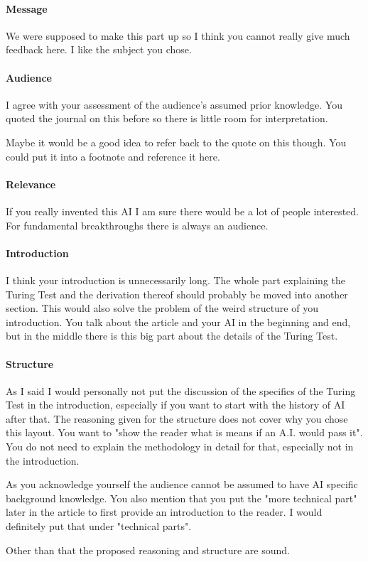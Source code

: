 \documentclass[12pt, a4paper]{article}
\begin{document}
\paragraph{Message}
We were supposed to make this part up so I think you cannot really give much feedback here. I like the subject you chose.

\paragraph{Audience}
I agree with your assessment of the audience's assumed prior knowledge. You quoted the journal on this before so there is little room for interpretation.

Maybe it would be a good idea to refer back to the quote on this though. You could put it into a footnote and reference it here.

\paragraph{Relevance}
If you really invented this AI I am sure there would be a lot of people interested. For fundamental breakthroughs there is always an audience.

\paragraph{Introduction}
I think your introduction is unnecessarily long. The whole part explaining the Turing Test and the derivation thereof should probably be moved into another section.
This would also solve the problem of the weird structure of you introduction. You talk about the article and your AI in the beginning and end, but in the middle there is this big part about the details of the Turing Test.

\paragraph{Structure}
As I said I would personally not put the discussion of the specifics of the Turing Test in the introduction, especially if you want to start with the history of AI after that. The reasoning given for the structure does not cover why you chose this layout. You want to "show the reader what is means if an A.I. would pass it". You do not need to explain the methodology in detail for that, especially not in the introduction.

As you acknowledge yourself the audience cannot be assumed to have AI specific background knowledge. You also mention that you put the "more technical part" later in the article to first provide an introduction to the reader. I would definitely put that under "technical parts".

Other than that the proposed reasoning and structure are sound.
\end{document}
